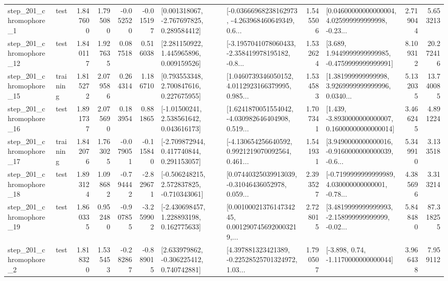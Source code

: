 \begin{tabular}{llrrrrllrlrr}
   step\_201\_chromophore\_1 &      test &      1.847600 &    1.795080 &     -0.052520 & -0.015197 &    [0.001318067, -2.767697825, 0.289584412] &  [-0.03666968238162973, -4.263968460649349, 0.6... &       1.545506 &  [0.04600000000000004, 4.025999999999998, -0.23... &            2.719044 &          5.653213 \\
  step\_201\_chromophore\_12 &      test &      1.840117 &    1.927635 &      0.087518 &  0.516038 &     [2.281150922, 1.445965896, 0.009159526] &  [-3.1957041078060433, -2.358419978195182, -0.8... &       1.532624 &   [3.689, 1.9449999999999985, -0.4759999999999991] &            8.109312 &         20.272416 \\
  step\_201\_chromophore\_15 &  training &      1.815272 &    2.079586 &      0.264314 &  1.186710 &     [0.793553348, 2.700847616, 0.227675955] &  [1.0460739346050152, 4.0112923166379995, 0.985... &       1.534583 &  [1.381999999999998, 3.9269999999999996, 0.0340... &            5.132035 &         13.740085 \\
  step\_201\_chromophore\_16 &      test &      1.891737 &    2.075690 &      0.183954 &  0.881865 &     [-1.01500241, 2.538561642, 0.043616173] &  [1.6241870051554042, -4.030982646404908, 0.519... &       1.707341 &  [1.439, -3.8930000000000007, 0.16000000000000014] &            3.466245 &          4.891224 \\
  step\_201\_chromophore\_17 &  training &      1.842076 &    1.763025 &     -0.079051 & -0.115840 &    [-2.709872944, 0.417740844, 0.291153057] &  [-4.130654256640592, 0.9921219070092564, 0.461... &       1.541931 &  [3.9490000000000016, -0.9160000000000039, -0.6... &            5.349910 &          3.133518 \\
  step\_201\_chromophore\_18 &      test &      1.893124 &    1.098682 &     -0.794442 & -2.829671 &   [-0.506248215, 2.572837825, -0.710343061] &  [0.07440325039913039, -0.31046436052978, 0.059... &       2.393527 &  [-0.7199999999999989, 4.030000000000001, -0.78... &            4.385696 &          3.313214 \\
  step\_201\_chromophore\_19 &      test &      1.860335 &    0.952480 &     -0.907855 & -3.259902 &    [-2.430698457, 1.228893198, 0.162775633] &  [0.0010002137614734245, 0.0012907456920003219,... &       2.728015 &  [3.4819999999999993, -2.158999999999999, -0.02... &            5.848480 &         87.318255 \\
   step\_201\_chromophore\_2 &      test &      1.818320 &    1.535453 &     -0.282867 & -0.889015 &    [2.633979862, -0.306225412, 0.740742881] &  [4.397881323421389, -0.22528525701324972, 1.03... &       1.790507 &                [-3.898, 0.74, -1.1170000000000044] &            3.966438 &          7.959112 \\

\end{tabular}
